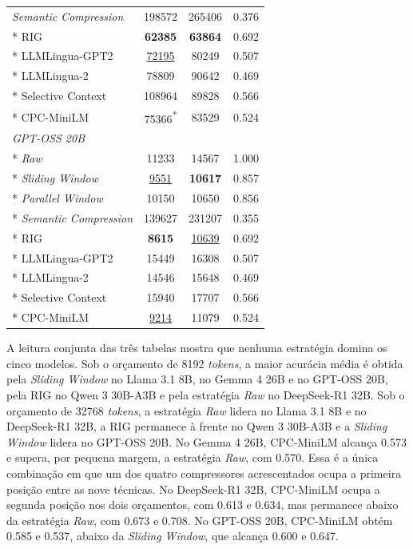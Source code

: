 {\begin{longtable}{lcc|c}
\textit{Semantic Compression}  & 198572            & 265406            & 0.376 \\*
RIG                            & \textbf{62385}    & \textbf{63864}    & 0.692 \\*
LLMLingua-GPT2                 & \underline{72195} & 80249             & 0.507 \\*
LLMLingua-2                    & 78809             & 90642             & 0.469 \\*
Selective Context              & 108964            & 89828             & 0.566 \\*
CPC-MiniLM                     & 75366\textsuperscript{*} & 83529      & 0.524 \\
\midrule
\multicolumn{4}{l}{\textit{GPT-OSS 20B}} \\*
\textit{Raw}                   & 11233            & 14567             & 1.000 \\*
\textit{Sliding Window}        & \underline{9551} & \textbf{10617}    & 0.857 \\*
\textit{Parallel Window}       & 10150            & 10650             & 0.856 \\*
\textit{Semantic Compression}  & 139627           & 231207            & 0.355 \\*
RIG                            & \textbf{8615}    & \underline{10639} & 0.692 \\*
LLMLingua-GPT2                 & 15449            & 16308             & 0.507 \\*
LLMLingua-2                    & 14546            & 15648             & 0.469 \\*
Selective Context              & 15940            & 17707             & 0.566 \\*
CPC-MiniLM                     & \underline{9214} & 11079             & 0.524 \\
\end{longtable}
}

A leitura conjunta das três tabelas mostra que nenhuma estratégia domina os cinco modelos. Sob o orçamento de 8192 \textit{tokens}, a maior acurácia média é obtida pela \textit{Sliding Window} no Llama 3.1 8B, no Gemma 4 26B e no GPT-OSS 20B, pela RIG no Qwen 3 30B-A3B e pela estratégia \textit{Raw} no DeepSeek-R1 32B. Sob o orçamento de 32768 \textit{tokens}, a estratégia \textit{Raw} lidera no Llama 3.1 8B e no DeepSeek-R1 32B, a RIG permanece à frente no Qwen 3 30B-A3B e a \textit{Sliding Window} lidera no GPT-OSS 20B. No Gemma 4 26B, CPC-MiniLM alcança 0.573 e supera, por pequena margem, a estratégia \textit{Raw}, com 0.570. Essa é a única combinação em que um dos quatro compressores acrescentados ocupa a primeira posição entre as nove técnicas. No DeepSeek-R1 32B, CPC-MiniLM ocupa a segunda posição nos dois orçamentos, com 0.613 e 0.634, mas permanece abaixo da estratégia \textit{Raw}, com 0.673 e 0.708. No GPT-OSS 20B, CPC-MiniLM obtém 0.585 e 0.537, abaixo da \textit{Sliding Window}, que alcança 0.600 e 0.647.

